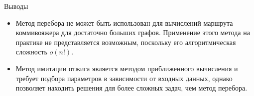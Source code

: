 \documentclass[ignoreonframetext,unicode]{beamer}
\begin{document}
\begin{frame}{Выводы}
	\begin{itemize}
		
	\item Метод перебора не может быть использован для вычислений маршрута коммивояжера для достаточно больших графов. Применение этого метода на практике не представляется возможным, поскольку его алгоритмическая сложность $o(n!)$.
	
	\item Метод имитации отжига является методом приближенного вычисления и требует подбора параметров в зависимости от входных данных, однако позволяет находить решения для более сложных задач, чем метод перебора.
	\end{itemize}
\end{frame}
\end{document}
